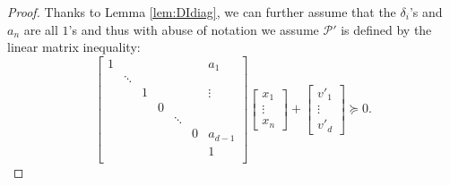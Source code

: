 \documentclass[sigconf]{acmart}
\newcommand{\PP}{\mathcal{P}}
\def\diag{\mathrm{diag}}
\begin{document}
\begin{proof}
Thanks to Lemma \ref{lem:DIdiag},
we can further assume that the $\delta_i$'s and $a_n$ are all $1$'s
and thus with abuse of notation we assume $\PP'$ is defined by
the linear matrix inequality:
\[
\left[
\begin{smallmatrix}
1 &        &   &   &        &   & a_1     \\[-.25cm]
  & \ddots &   &   &        &   &         \\[-.35cm]
  &	   & 1 &   &        &   &  \vdots  \\
&	   &   & 0 &        &   &    \\[-.25cm]
  &	   &   &   & \ddots &   &         \\
  &	   &   &   &	    & 0 & a_{d-1} \\ 
  &	   &   &   &	    &	& 1 	  \\
\end{smallmatrix}
\right]
\begin{bmatrix}
  x_1 \\
  \vdots \\
  x_n
\end{bmatrix}
+
\begin{bmatrix}
  v'_1 \\
  \vdots \\
  v'_d
\end{bmatrix}
\succeq 0.
\]


\end{proof}
\end{document}

